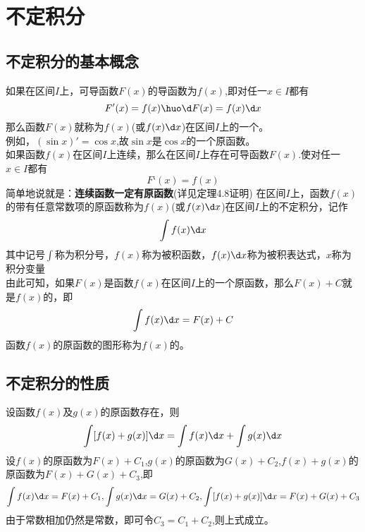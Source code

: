 \chapter{不定积分}
\section{不定积分的基本概念}
如果在区间$I$上，可导函数$F(x)$的导函数为$f(x)$,即对任一$x\in I$都有
\begin{equation}
	F'(x)=f(x)\huo \d F(x)=f(x)\d x
\end{equation}
那么函数$F(x)$就称为$f(x)$(或$f(x)\d x$)在区间$I$上的一个。\\
\kg 例如，$(\sin x)'=\cos x$,故$\sin x$是$\cos x$的一个原函数。
\\ 

\sj
\theorem[原函数存在定理]
如果函数$f(x)$在区间$I$上连续，那么在区间$I$上存在可导函数$F(x)$.使对任一$x\in I$都有
\begin{equation}
	F‘(x)=f(x)
\end{equation}
简单地说就是：\textbf{连续函数一定有原函数}(详见定理4.8证明)
\warn[\kg 由于常数$C$的导数$(C)‘=0$,故一个函数的原函数有多个，可表示为$F(x)+C$($C$为常数)。]
在区间$I$上，函数$f(x)$的带有任意常数项的原函数称为$f(x)$(或$f(x)\d x$)在区间$I$上的不定积分，记作
\begin{equation}
	\int f(x)\d x
\end{equation}
其中记号$\int$称为积分号，$f(x)$称为被积函数，$f(x)\d x$称为被积表达式，$x$称为积分变量
\\ 由此可知，如果$F(x)$是函数$f(x)$在区间$I$上的一个原函数，那么$F(x)+C$就是$f(x)$的，即
\begin{equation}
	\int f(x)\d x=F(x)+C
\end{equation}
\kg 函数$f(x)$的原函数的图形称为$f(x)$的。
\section{不定积分的性质}
\theorem[不定积分性质1]
设函数$f(x)$及$g(x)$的原函数存在，则
\begin{equation}
	\int [f(x)+g(x)]\d x=\int f(x)\d x+\int g(x)\d x
\end{equation}
\proof 设$f(x)$的原函数为$F(x)+C_1$,$g(x)$的原函数为$G(x)+C_2$,$f(x)+g(x)$的原函数为$F(x)+G(x)+C_3$,即
\begin{equation}
	\nonumber
	\int f(x)\d x=F(x)+C_1,\int g(x)\d x=G(x)+C_2,\int[f(x)+g(x)]\d x=F(x)+G(x)
+C_3\end{equation}
由于常数相加仍然是常数，即可令$C_3=C_1+C_2$,则上式成立。


